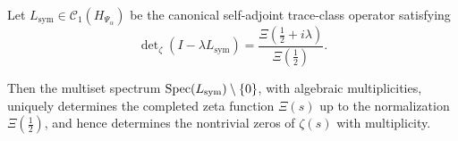 \begin{corollary}
\label{cor:spectrum-determines-zeta}
Let \( L_{\mathrm{sym}} \in \mathcal{C}_1(H_{\Psi_\alpha}) \) be the canonical self-adjoint trace-class operator satisfying
\[
\det\nolimits_\zeta(I - \lambda L_{\mathrm{sym}}) = \frac{\Xi(\tfrac{1}{2} + i\lambda)}{\Xi(\tfrac{1}{2})}.
\]

Then the multiset spectrum \( \operatorname{Spec}(L_{\mathrm{sym}}) \setminus \{0\} \), with algebraic multiplicities, uniquely determines the completed zeta function \( \Xi(s) \) up to the normalization \( \Xi(\tfrac{1}{2}) \), and hence determines the nontrivial zeros of \( \zeta(s) \) with multiplicity.
\end{corollary}
%  